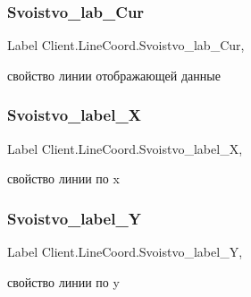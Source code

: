 \subsubsection{\texorpdfstring{Svoistvo\+\_\+lab\+\_\+\+Cur}{Svoistvo\_lab\_Cur}}
{\footnotesize\ttfamily Label Client.\+Line\+Coord.\+Svoistvo\+\_\+lab\+\_\+\+Cur\hspace{0.3cm}{\ttfamily [get]}, {\ttfamily [set]}}



свойство линии отображающей данные 

\hypertarget{class_client_1_1_line_coord_ab896e31d73c3bd32bbec4c389b075f19}{}\label{class_client_1_1_line_coord_ab896e31d73c3bd32bbec4c389b075f19} 
\subsubsection{\texorpdfstring{Svoistvo\+\_\+label\+\_\+X}{Svoistvo\_label\_X}}
{\footnotesize\ttfamily Label Client.\+Line\+Coord.\+Svoistvo\+\_\+label\+\_\+X\hspace{0.3cm}{\ttfamily [get]}, {\ttfamily [set]}}



свойство линии по x 

\hypertarget{class_client_1_1_line_coord_a78a8315868d88677c9780a1025bfc604}{}\label{class_client_1_1_line_coord_a78a8315868d88677c9780a1025bfc604} 
\subsubsection{\texorpdfstring{Svoistvo\+\_\+label\+\_\+Y}{Svoistvo\_label\_Y}}
{\footnotesize\ttfamily Label Client.\+Line\+Coord.\+Svoistvo\+\_\+label\+\_\+Y\hspace{0.3cm}{\ttfamily [get]}, {\ttfamily [set]}}



свойство линии по y 

\hypertarget{class_client_1_1_line_coord_a8008869c1c2c60c6d1236f80200c383e}{}\label{class_client_1_1_line_coord_a8008869c1c2c60c6d1236f80200c383e} 
